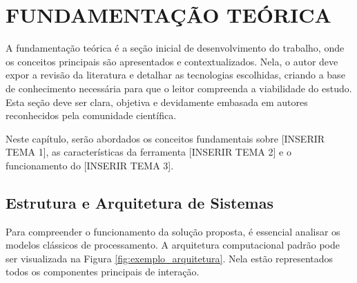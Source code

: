
\chapter[Fundamentação Teórica]{FUNDAMENTAÇÃO TEÓRICA}
\label{sec:fundamentacao-teorica}

A fundamentação teórica é a seção inicial de desenvolvimento do trabalho, onde os conceitos principais são apresentados e contextualizados. Nela, o autor deve expor a revisão da literatura e detalhar as tecnologias escolhidas, criando a base de conhecimento necessária para que o leitor compreenda a viabilidade do estudo. Esta seção deve ser clara, objetiva e devidamente embasada em autores reconhecidos pela comunidade científica.

Neste capítulo, serão abordados os conceitos fundamentais sobre [INSERIR TEMA 1], as características da ferramenta [INSERIR TEMA 2] e o funcionamento do [INSERIR TEMA 3].
\section{Estrutura e Arquitetura de Sistemas}

Para compreender o funcionamento da solução proposta, é essencial analisar os modelos clássicos de processamento. A arquitetura computacional padrão pode ser visualizada na Figura \ref{fig:exemplo_arquitetura}. Nela estão representados todos os componentes principais de interação.

